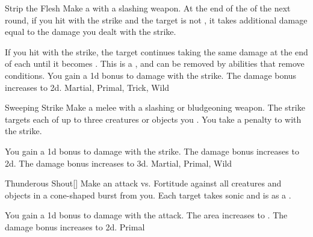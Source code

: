 \lowercase{\hypertarget{maneuver:Strip the Flesh}{}}\label{maneuver:Strip the Flesh}
\begin{apability}{\hypertarget{maneuver:Strip the Flesh}{Strip the Flesh}}
Make a  with a slashing weapon.
At the end of the  of the next round,
if you hit with the strike and the target is not ,
it takes additional damage equal to the damage you dealt with the strike.

\rankline
{} If you hit with the strike, the target continues taking the same damage
at the end of each  until it becomes .
This is a , and can be removed by abilities that remove conditions.
 You gain a \plus1d bonus to damage with the strike.
 The damage bonus increases to \plus2d.
 Martial, Primal, Trick, Wild
\end{apability}
\vspace{0.25em}



\lowercase{\hypertarget{maneuver:Sweeping Strike}{}}\label{maneuver:Sweeping Strike}
\begin{apability}{\hypertarget{maneuver:Sweeping Strike}{Sweeping Strike}}
Make a melee  with a slashing or bludgeoning weapon.
The strike targets each of up to three creatures or objects you .
You take a  penalty to  with the strike.

\rankline
{} You gain a \plus1d bonus to damage with the strike.
 The damage bonus increases to \plus2d.
 The damage bonus increases to \plus3d.
 Martial, Primal, Wild
\end{apability}
\vspace{0.25em}



\lowercase{\hypertarget{maneuver:Thunderous Shout}{}}\label{maneuver:Thunderous Shout}
\begin{apability}{\hypertarget{maneuver:Thunderous Shout}{Thunderous Shout}}[]
Make an attack vs. Fortitude against all creatures and objects in a \areamed cone-shaped burst from you.
\hit Each target takes sonic  and is  as a .

\rankline
{} You gain a \plus1d bonus to damage with the attack.
 The area increases to \arealarge.
 The damage bonus increases to \plus2d.
 Primal
\end{apability}
\vspace{0.25em}



